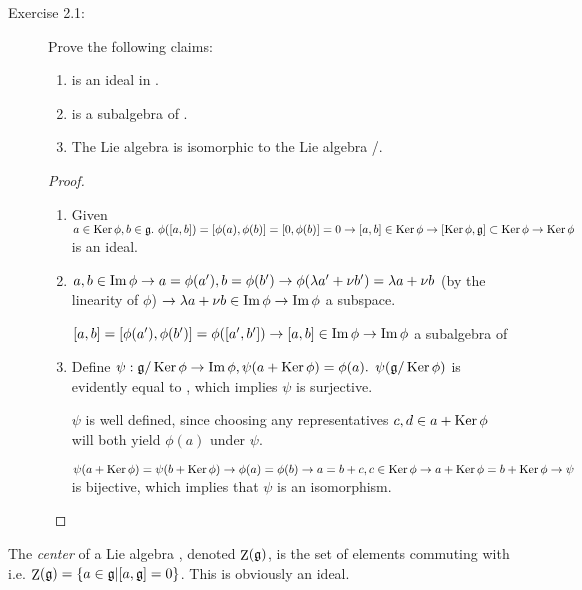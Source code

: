\documentclass[aps,onecolumn,secnumarabic,nobalancelastpage,amsmath,amssymb]{revtex4}
\DeclareMathOperator{\Center}{Z}
\begin{document}
\renewcommand{\labelenumi}{\alph{enumi})}
\begin{description}
\item[Exercise 2.1:] Prove the following claims:
\begin{enumerate}
\item {\K} is an ideal in {\g}.
\item {\I} is a subalgebra of {\g}.
\item The Lie algebra {\I} is isomorphic to the Lie algebra {\g}/{\K}.
\end{enumerate}
\begin{proof}\ 

\begin{enumerate}
\item Given $a \in \operatorname{Ker} \phi, b \in \mathord{\mathfrak{g}}.\text{ }\phi([a,b]) = [\phi(a),\phi(b)] = [0,\phi(b)] = 0 \rightarrow [a,b] \in \operatorname{Ker} \phi \rightarrow [\operatorname{Ker} \phi,\mathord{\mathfrak{g}}] \subset \operatorname{Ker} \phi \rightarrow \operatorname{Ker} \phi$ is an ideal.
\item $a,b \in \operatorname{Im} \phi \rightarrow a = \phi(a'), b = \phi(b') \rightarrow \phi(\lambda a' + \nu b') = \lambda a + \nu b$ (by the linearity of $\phi$) $\rightarrow \lambda a + \nu b \in \operatorname{Im} \phi \rightarrow \operatorname{Im} \phi$ a subspace.

$[a,b] = [\phi(a'),\phi(b')] = \phi([a',b']) \rightarrow [a,b] \in \operatorname{Im} \phi \rightarrow \operatorname{Im} \phi$ a subalgebra of {\g}

\item Define $\psi: \mathord{\mathfrak{g}}/\operatorname{Ker} \phi \rightarrow \operatorname{Im} \phi, \psi(a+\operatorname{Ker} \phi) = \phi(a).$ $\psi(\mathord{\mathfrak{g}}/\operatorname{Ker} \phi)$ is evidently equal to {\I}, which implies $\psi$ is surjective.

$\psi$ is well defined, since choosing any representatives $c,d \in a+\operatorname{Ker} \phi$ will both yield $\phi(a)$ under $\psi$.

$\psi(a+\operatorname{Ker} \phi) = \psi(b+\operatorname{Ker} \phi) \rightarrow \phi(a) = \phi(b) \rightarrow a = b+c, c \in \operatorname{Ker} \phi \rightarrow a+\operatorname{Ker} \phi=b+\operatorname{Ker} \phi \rightarrow \psi$ is bijective, which implies that $\psi$ is an isomorphism. 
\end{enumerate}
\end{proof}
\end{description}
The {\slshape center} of a Lie algebra \g, denoted $\Center(\g)$, is the set of elements commuting with {\g} i.e. $\Center(\g) = \{ a \in \g | [a,\g] = 0\}$. This is obviously an ideal.
\end{document}
